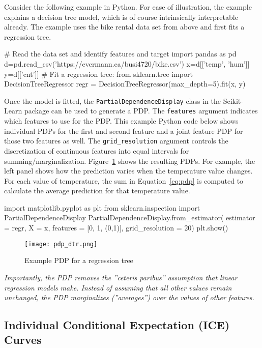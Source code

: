 Consider the following example in Python. For ease of illustration, the example explains a decision tree model, which is of course intrinsically interpretable already. The example uses the bike rental data set from above and first fits a regression tree.

\begin{pythoncode}
# Read the data set and identify features and target
import pandas as pd
d=pd.read_csv('https://evermann.ca/busi4720/bike.csv')
x=d[['temp', 'hum']]
y=d[['cnt']]
# Fit a regression tree:
from sklearn.tree import DecisionTreeRegressor
regr = DecisionTreeRegressor(max_depth=5).fit(x, y)
\end{pythoncode}

Once the model is fitted, the \texttt{PartialDependenceDisplay} class in the Scikit-Learn package can be used to generate a PDP. The \texttt{features} argument indicates which features to use for the PDP. This example Python code below shows individual PDPs for the first and second feature and a joint feature PDP for those two features as well. The \texttt{grid\_resolution} argument controls the discretization of continuous features into equal intervals for summing/marginalization. Figure~\ref{fig:pdp} shows the resulting PDPs. For example, the left panel shows how the prediction varies when the temperature value changes. For each value of temperature, the sum in Equation~\ref{eq:pdp} is computed to calculate the average prediction for that temperature value.

\begin{pythoncode}
import matplotlib.pyplot as plt
from sklearn.inspection import PartialDependenceDisplay
PartialDependenceDisplay.from_estimator(
    estimator = regr, 
    X = x, features = [0, 1, (0,1)], grid_resolution = 20)
plt.show()
\end{pythoncode}

\begin{figure}
\centering
\texttt{[image: pdp\_dtr.png]}
\caption{Example PDP for a regression tree}
\label{fig:pdp}
\end{figure}

\emph{Importantly, the PDP removes the ''ceteris paribus'' assumption that linear regression models make. Instead of assuming that all other values remain unchanged, the PDP marginalizes (''averages'') over the values of other features.}

\subsection{Individual Conditional Expectation (ICE) Curves}

